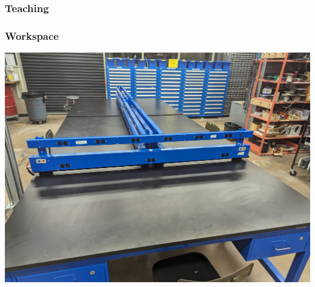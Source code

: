 \documentclass{presentation}
\begin{document}
\begin{frame}\frametitle{Teaching}
\end{frame}

\begin{frame}\frametitle{Workspace}
  \includegraphics[width=\textwidth]{"./workspace.jpg"}
\end{frame}
\end{document}

